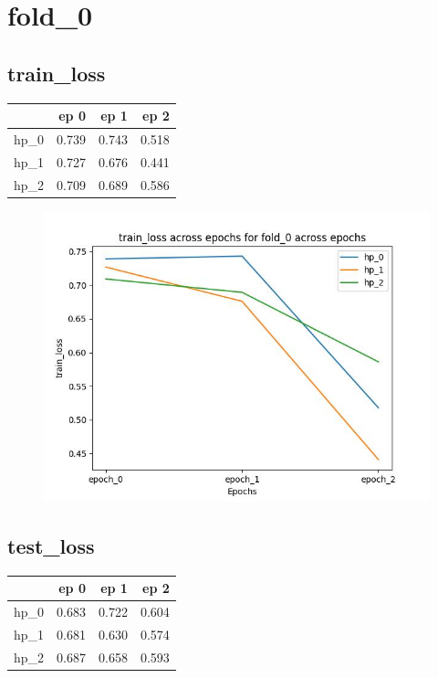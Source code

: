 \documentclass{article}
\begin{document}
\section{fold\_0}
\subsection{train\_loss}
\begin{tabular}{lrrr}
\toprule
{} &   ep 0 &   ep 1 &   ep 2 \\
\midrule
hp\_0 &  0.739 &  0.743 &  0.518 \\
hp\_1 &  0.727 &  0.676 &  0.441 \\
hp\_2 &  0.709 &  0.689 &  0.586 \\
\bottomrule
\end{tabular}

\begin{figure}[H]
\includegraphics[scale = 0.75]{fold_0/train_loss}
\end{figure}
\subsection{test\_loss}
\begin{tabular}{lrrr}
\toprule
{} &   ep 0 &   ep 1 &   ep 2 \\
\midrule
hp\_0 &  0.683 &  0.722 &  0.604 \\
hp\_1 &  0.681 &  0.630 &  0.574 \\
hp\_2 &  0.687 &  0.658 &  0.593 \\
\bottomrule
\end{tabular}
\end{document}
